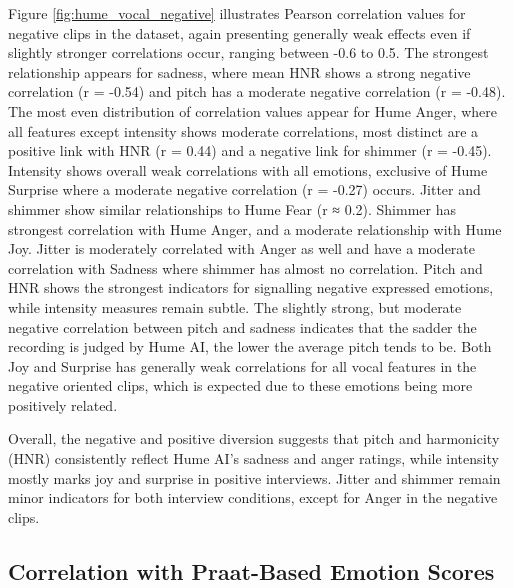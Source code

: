 Figure \ref{fig:hume_vocal_negative} illustrates Pearson correlation values for negative clips in the dataset, again presenting generally weak effects even if slightly stronger correlations occur, ranging between -0.6 to 0.5. 
The strongest relationship appears for sadness, where mean HNR shows a strong negative correlation (r = -0.54) and pitch has a moderate negative correlation (r = -0.48). The most even distribution of correlation values appear for Hume Anger, 
where all features except intensity shows moderate correlations, most distinct are a positive link with HNR (r = 0.44) and a negative link for shimmer (r = -0.45). Intensity shows overall weak correlations with all emotions, exclusive of Hume Surprise where a moderate negative correlation (r = -0.27) occurs. 
Jitter and shimmer show similar relationships to Hume Fear (r ≈ 0.2). Shimmer has strongest correlation with Hume Anger, and a moderate relationship with Hume Joy. Jitter is moderately correlated with Anger as well and have a moderate correlation with Sadness where shimmer has almost no correlation. 
Pitch and HNR shows the strongest indicators for signalling negative expressed emotions, while intensity measures remain subtle. The slightly strong, but moderate negative correlation between pitch and sadness indicates that the sadder the recording is judged by Hume AI, the lower the average pitch tends to be. 
Both Joy and Surprise has generally weak correlations for all vocal features in the negative oriented clips, which is expected due to these emotions being more positively related. 

\medskip
Overall, the negative and positive diversion suggests that pitch and harmonicity (HNR) consistently reflect Hume AI’s sadness and anger ratings, while intensity mostly marks joy and surprise in positive interviews. Jitter and shimmer remain minor indicators for both interview conditions, except for Anger in the negative clips. 

\subsection{Correlation with Praat-Based Emotion Scores}

